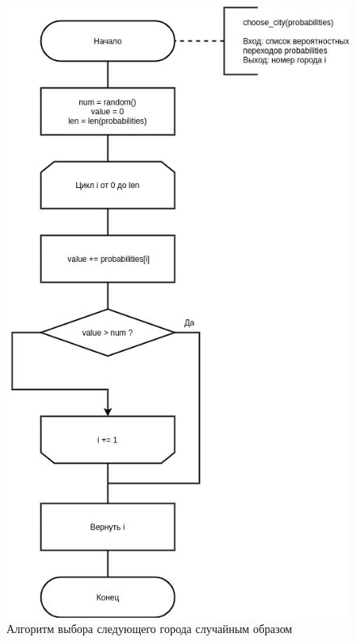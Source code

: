 \begin{figure}[!h]
	\centering
	\includegraphics[scale=0.7]{images/choose.png}
	\caption{Алгоритм выбора следующего города случайным образом}
	\label{img:choose}
\end{figure}

